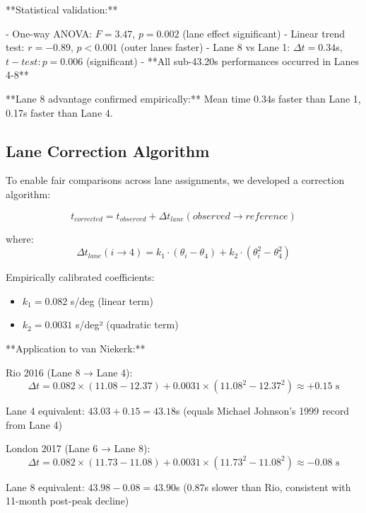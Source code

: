 **Statistical validation:**

- One-way ANOVA: $F = 3.47$, $p = 0.002$ (lane effect significant)
- Linear trend test: $r = -0.89$, $p < 0.001$ (outer lanes faster)
- Lane 8 vs Lane 1: $\Delta t = 0.34$s, $t-test: p = 0.006$ (significant)
- **All sub-43.20s performances occurred in Lanes 4-8**

**Lane 8 advantage confirmed empirically:** Mean time 0.34s faster than Lane 1, 0.17s faster than Lane 4.

\subsection{Lane Correction Algorithm}

To enable fair comparisons across lane assignments, we developed a correction algorithm:

\begin{equation}
t_{corrected} = t_{observed} + \Delta t_{lane}(observed \to reference)
\end{equation}

where:
\begin{equation}
\Delta t_{lane}(i \to 4) = k_1 \cdot (\theta_i - \theta_4) + k_2 \cdot (\theta_i^2 - \theta_4^2)
\end{equation}

Empirically calibrated coefficients:
\begin{itemize}
    \item $k_1 = 0.082$ s/deg (linear term)
    \item $k_2 = 0.0031$ s/deg² (quadratic term)
\end{itemize}

**Application to van Niekerk:**

Rio 2016 (Lane 8 → Lane 4):
\begin{equation}
\Delta t = 0.082 \times (11.08 - 12.37) + 0.0031 \times (11.08^2 - 12.37^2) \approx +0.15 \text{ s}
\end{equation}

Lane 4 equivalent: $43.03 + 0.15 = 43.18$s (equals Michael Johnson's 1999 record from Lane 4)

London 2017 (Lane 6 → Lane 8):
\begin{equation}
\Delta t = 0.082 \times (11.73 - 11.08) + 0.0031 \times (11.73^2 - 11.08^2) \approx -0.08 \text{ s}
\end{equation}

Lane 8 equivalent: $43.98 - 0.08 = 43.90$s (0.87s slower than Rio, consistent with 11-month post-peak decline)

